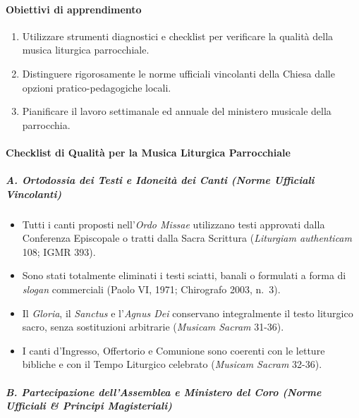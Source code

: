 \documentclass[12pt,a4paper]{article}
\begin{document}
	\paragraph{Obiettivi di apprendimento}\label{obiettivi-di-apprendimento-16}
	
	\begin{enumerate}[label=\arabic*.,leftmargin=*]
		\item Utilizzare strumenti diagnostici e checklist per verificare la qualità della musica liturgica parrocchiale.
		\item Distinguere rigorosamente le norme ufficiali vincolanti della Chiesa dalle opzioni pratico-pedagogiche locali.
		\item Pianificare il lavoro settimanale ed annuale del ministero musicale della parrocchia.
	\end{enumerate}
	
	\paragraph{Checklist di Qualità per la Musica Liturgica Parrocchiale}\label{checklist-di-qualita-per-la-musica-liturgica-parrocchiale}
	
	\subparagraph{A. Ortodossia dei Testi e Idoneità dei Canti (Norme Ufficiali Vincolanti)}\label{a-ortodossia-dei-testi-e-idoneita-dei-canti}
	
	\begin{itemize}[leftmargin=*,label=$\square$]
		\item Tutti i canti proposti nell'\emph{Ordo Missae} utilizzano testi approvati dalla Conferenza Episcopale o tratti dalla Sacra Scrittura (\emph{Liturgiam authenticam} 108; IGMR 393).
		\item Sono stati totalmente eliminati i testi sciatti, banali o formulati a forma di \emph{slogan} commerciali (Paolo VI, 1971; Chirografo 2003, n.~3).
		\item Il \emph{Gloria}, il \emph{Sanctus} e l'\emph{Agnus Dei} conservano integralmente il testo liturgico sacro, senza sostituzioni arbitrarie (\emph{Musicam Sacram} 31-36).
		\item I canti d'Ingresso, Offertorio e Comunione sono coerenti con le letture bibliche e con il Tempo Liturgico celebrato (\emph{Musicam Sacram} 32-36).
	\end{itemize}
	
	\subparagraph{B. Partecipazione dell'Assemblea e Ministero del Coro (Norme Ufficiali \& Principi Magisteriali)}\label{b-partecipazione-dellassemblea-e-ministero-del-coro}
	
\end{document}

